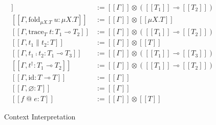 \documentclass[a4j, dvipdfmx]{jsarticle}
\theoremstyle{definition}
\newcommand{\semantics}[1]{[\![ #1 ]\!]}
\begin{document}
\begin{figure}[H]
\begin{minipage}[b]{0.48\columnwidth}
\begin{align*}
      \semantics{\Gamma,t_1\mapsto{}t_2:T_1\multimap{}T_2}   &:= \semantics{\Gamma}\otimes(\semantics{T_1}\multimap\semantics{T_2}) \\
      \semantics{\Gamma,\text{fold}_{\mu{X}.T}\;u:\mu{X}.T}  &:= \semantics{\Gamma}\otimes\semantics{\mu{X}.T} \\
      \semantics{\Gamma,\text{trace}_T\;t:T_1\multimap{}T_2} &:= \semantics{\Gamma}\otimes(\semantics{T_1}\multimap\semantics{T_2}) \\
      \semantics{\Gamma,t_1\parallel{}t_2:T}                 &:= \semantics{\Gamma}\otimes\semantics{T} \\
      \semantics{\Gamma,t_1\fcmp{}t_2:T_1\multimap{}T_3}     &:= \semantics{\Gamma}\otimes(\semantics{T_1}\multimap\semantics{T_3}) \\
      \semantics{\Gamma,t^\dagger:T_1\multimap{}T_2}         &:= \semantics{\Gamma}\otimes(\semantics{T_1}\multimap\semantics{T_2}) \\
      \semantics{\Gamma,\text{id}:T\multimap{}T}             &:= \semantics{\Gamma} \\
      \semantics{\Gamma,\varnothing:T}                       &:= \semantics{\Gamma} \\
      \semantics{f\;\text{@}\;e:T}                           &:= \semantics{\Gamma}\otimes\semantics{T}
    \end{align*}
    \caption{Context Interpretation}
    \label{fig:cxt_interpret}
  \end{minipage}
\end{figure}
\end{document}

